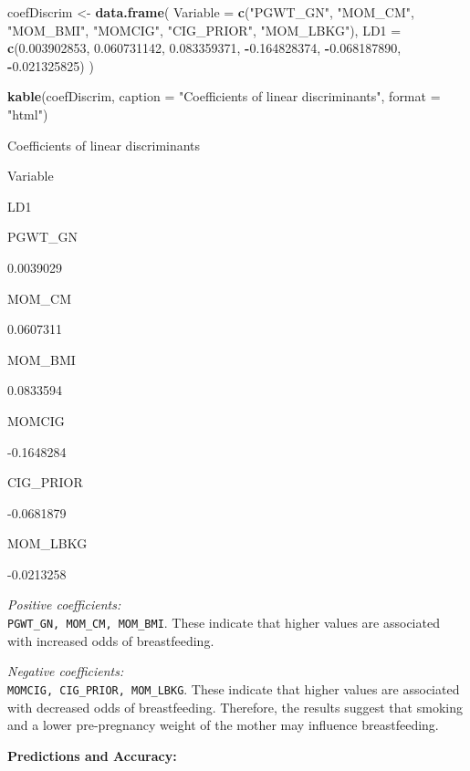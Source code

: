 \documentclass[
]{article}
\newenvironment{Shaded}{\begin{snugshade}}{\end{snugshade}}
\newcommand{\AttributeTok}[1]{\textcolor[rgb]{0.13,0.29,0.53}{#1}}
\newcommand{\FloatTok}[1]{\textcolor[rgb]{0.00,0.00,0.81}{#1}}
\newcommand{\FunctionTok}[1]{\textcolor[rgb]{0.13,0.29,0.53}{\textbf{#1}}}
\newcommand{\NormalTok}[1]{#1}
\newcommand{\OtherTok}[1]{\textcolor[rgb]{0.56,0.35,0.01}{#1}}
\newcommand{\SpecialCharTok}[1]{\textcolor[rgb]{0.81,0.36,0.00}{\textbf{#1}}}
\newcommand{\StringTok}[1]{\textcolor[rgb]{0.31,0.60,0.02}{#1}}
\begin{document}
\begin{Shaded}
\begin{Highlighting}[]
\NormalTok{coefDiscrim }\OtherTok{\textless{}{-}} \FunctionTok{data.frame}\NormalTok{(}
  \AttributeTok{Variable =} \FunctionTok{c}\NormalTok{(}\StringTok{"PGWT\_GN"}\NormalTok{, }\StringTok{"MOM\_CM"}\NormalTok{, }\StringTok{"MOM\_BMI"}\NormalTok{, }\StringTok{"MOMCIG"}\NormalTok{, }\StringTok{"CIG\_PRIOR"}\NormalTok{, }\StringTok{"MOM\_LBKG"}\NormalTok{),}
  \AttributeTok{LD1 =} \FunctionTok{c}\NormalTok{(}\FloatTok{0.003902853}\NormalTok{, }\FloatTok{0.060731142}\NormalTok{, }\FloatTok{0.083359371}\NormalTok{, }\SpecialCharTok{{-}}\FloatTok{0.164828374}\NormalTok{, }\SpecialCharTok{{-}}\FloatTok{0.068187890}\NormalTok{, }\SpecialCharTok{{-}}\FloatTok{0.021325825}\NormalTok{)}
\NormalTok{)}

\FunctionTok{kable}\NormalTok{(coefDiscrim, }\AttributeTok{caption =} \StringTok{"Coefficients of linear discriminants"}\NormalTok{, }\AttributeTok{format =} \StringTok{"html"}\NormalTok{)}
\end{Highlighting}
\end{Shaded}

Coefficients of linear discriminants

Variable

LD1

PGWT\_GN

0.0039029

MOM\_CM

0.0607311

MOM\_BMI

0.0833594

MOMCIG

-0.1648284

CIG\_PRIOR

-0.0681879

MOM\_LBKG

-0.0213258

\emph{Positive coefficients:}\\
\texttt{PGWT\_GN,\ MOM\_CM,\ MOM\_BMI}. These indicate that higher
values are associated with increased odds of breastfeeding.

\emph{Negative coefficients:}\\
\texttt{MOMCIG,\ CIG\_PRIOR,\ MOM\_LBKG}. These indicate that higher
values are associated with decreased odds of breastfeeding. Therefore,
the results suggest that smoking and a lower pre-pregnancy weight of the
mother may influence breastfeeding.

\textbf{Predictions and Accuracy:}\\
\end{document}
